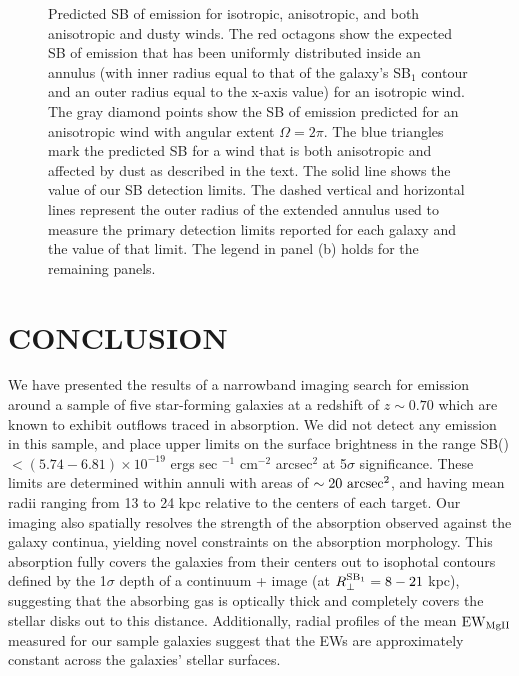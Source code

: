 \documentclass[twocolumn]{aastex62}
\begin{document}
\begin{figure}[h]
\centering
{}
\caption{Predicted SB of  emission for isotropic, anisotropic, and both anisotropic and dusty winds. The red octagons show the expected SB of emission that has been uniformly distributed inside an annulus (with inner radius equal to that of the galaxy's SB$_1$ contour and an outer radius equal to the x-axis value) for an isotropic wind. The gray diamond points show the SB of  emission predicted for an anisotropic wind with angular extent $\Omega=2\pi$. The blue triangles mark the predicted SB for a wind that is both anisotropic and affected by dust as described in the text. The solid line shows the value of our SB detection limits. The dashed vertical and horizontal lines represent the outer radius of the extended annulus used to measure the primary detection limits reported for each galaxy and the value of that limit. The legend in panel (b) holds for the remaining panels.}
\label{fig.emission}
\end{figure}

\section{CONCLUSION}\label{sec:conclusion}
We have presented the results of a narrowband imaging search for  emission around a sample of five star-forming galaxies at a redshift of $z \sim 0.70$ which are known to exhibit outflows traced in  absorption. We did not detect any  emission in this sample, and place  upper limits on the surface brightness in the range SB() $< (5.74-6.81) \times 10^{-19}$ ergs sec $^{-1}$ cm$^{-2}$ arcsec$^2$ at 5$\sigma$ significance. These limits are determined within annuli with areas of $\sim 20~\rm arcsec^2$, and having mean radii ranging from 13 to 24 kpc relative to the centers of each target. Our imaging also spatially resolves the strength of the  absorption observed against the galaxy continua, yielding novel constraints on the  absorption morphology. 
This absorption fully covers the galaxies from their centers out to isophotal contours defined by the %
1$\sigma$ depth of a continuum +  image (at %
$R_{\perp}^{\rm SB_1} = 8-21$ kpc),
suggesting that the absorbing gas is optically thick and completely covers the stellar disks out to this distance. Additionally, radial profiles of the mean $\rm EW_{MgII}$ measured for our sample galaxies suggest that the EWs %
are approximately constant across the galaxies' stellar surfaces. 
\end{document}

